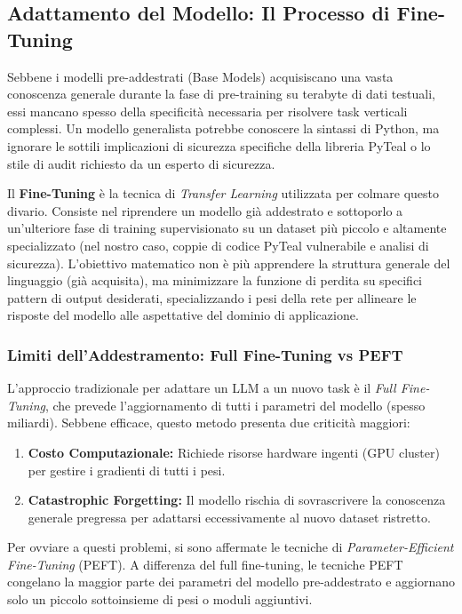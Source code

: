 \subsection{Adattamento del Modello: Il Processo di Fine-Tuning}
\label{sec:finetuning_intro}

Sebbene i modelli pre-addestrati (Base Models) acquisiscano una vasta conoscenza generale durante la fase di pre-training su terabyte di dati testuali, essi mancano spesso della specificità necessaria per risolvere task verticali complessi. Un modello generalista potrebbe conoscere la sintassi di Python, ma ignorare le sottili implicazioni di sicurezza specifiche della libreria PyTeal o lo stile di audit richiesto da un esperto di sicurezza.

Il \textbf{Fine-Tuning} è la tecnica di \textit{Transfer Learning} utilizzata per colmare questo divario. Consiste nel riprendere un modello già addestrato e sottoporlo a un'ulteriore fase di training supervisionato su un dataset più piccolo e altamente specializzato (nel nostro caso, coppie di codice PyTeal vulnerabile e analisi di sicurezza).
L'obiettivo matematico non è più apprendere la struttura generale del linguaggio (già acquisita), ma minimizzare la funzione di perdita su specifici pattern di output desiderati, specializzando i pesi della rete per allineare le risposte del modello alle aspettative del dominio di applicazione.

\subsubsection{Limiti dell'Addestramento: Full Fine-Tuning vs PEFT}
L'approccio tradizionale per adattare un LLM a un nuovo task è il \textit{Full Fine-Tuning}, che prevede l'aggiornamento di tutti i parametri del modello (spesso miliardi). Sebbene efficace, questo metodo presenta due criticità maggiori:
\begin{enumerate}
    \item \textbf{Costo Computazionale:} Richiede risorse hardware ingenti (GPU cluster) per gestire i gradienti di tutti i pesi.
    \item \textbf{Catastrophic Forgetting:} Il modello rischia di sovrascrivere la conoscenza generale pregressa per adattarsi eccessivamente al nuovo dataset ristretto.
\end{enumerate}

Per ovviare a questi problemi, si sono affermate le tecniche di \textit{Parameter-Efficient Fine-Tuning} (PEFT). A differenza del full fine-tuning, le tecniche PEFT congelano la maggior parte dei parametri del modello pre-addestrato e aggiornano solo un piccolo sottoinsieme di pesi o moduli aggiuntivi.

